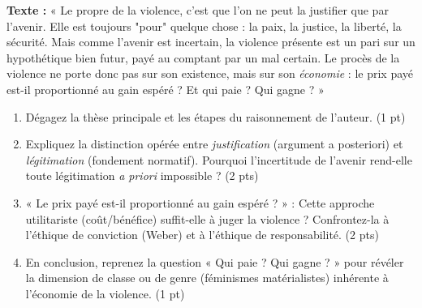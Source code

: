 \documentclass[11pt]{article}
\begin{document}
\begin{exercice}
\textbf{Texte :} « Le propre de la violence, c'est que l'on ne peut la justifier que par l'avenir. Elle est toujours "pour" quelque chose : la paix, la justice, la liberté, la sécurité. Mais comme l'avenir est incertain, la violence présente est un pari sur un hypothétique bien futur, payé au comptant par un mal certain. Le procès de la violence ne porte donc pas sur son existence, mais sur son \textit{économie} : le prix payé est-il proportionné au gain espéré ? Et qui paie ? Qui gagne ? »

\begin{enumerate}
    \item Dégagez la thèse principale et les étapes du raisonnement de l'auteur. \hfill (1 pt)
    \item Expliquez la distinction opérée entre \textit{justification} (argument a posteriori) et \textit{légitimation} (fondement normatif). Pourquoi l'incertitude de l'avenir rend-elle toute légitimation \textit{a priori} impossible ? \hfill (2 pts)
    \item « Le prix payé est-il proportionné au gain espéré ? » : Cette approche utilitariste (coût/bénéfice) suffit-elle à juger la violence ? Confrontez-la à l'éthique de conviction (Weber) et à l'éthique de responsabilité. \hfill (2 pts)
    \item En conclusion, reprenez la question « Qui paie ? Qui gagne ? » pour révéler la dimension de classe ou de genre (féminismes matérialistes) inhérente à l'économie de la violence. \hfill (1 pt)
\end{enumerate}
\end{exercice}
\end{document}
